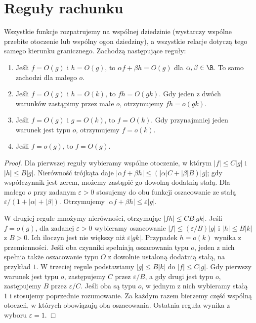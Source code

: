 \section{Reguły rachunku}
\begin{twierdzenie}
\label{ma1:thm:landau-algebra}
Wszystkie funkcje rozpatrujemy na wspólnej dziedzinie (wystarczy wspólne przebite otoczenie lub wspólny ogon dziedziny), a wszystkie relacje dotyczą tego samego kierunku granicznego. Zachodzą następujące reguły:
\begin{enumerate}
 \item Jeśli $f=O(g)$ i $h=O(g)$, to $\alpha f+\beta h=O(g)$ dla $\alpha,\beta\in\R$. To samo zachodzi dla małego $o$.
 \item Jeśli $f=O(g)$ i $h=O(k)$, to $fh=O(gk)$. Gdy jeden z dwóch warunków zastąpimy przez małe $o$, otrzymujemy $fh=o(gk)$.
 \item Jeśli $f=O(g)$ i $g=O(k)$, to $f=O(k)$. Gdy przynajmniej jeden warunek jest typu $o$, otrzymujemy $f=o(k)$.
 \item Jeśli $f=o(g)$, to $f=O(g)$.
\end{enumerate}
\end{twierdzenie}
\begin{proof}
Dla pierwszej reguły wybieramy wspólne otoczenie, w którym $|f|\le C|g|$ i $|h|\le B|g|$. Nierówność trójkąta daje
$|\alpha f+\beta h|\le(|\alpha|C+|\beta|B)|g|$; gdy współczynnik jest zerem, możemy zastąpić go dowolną dodatnią stałą. Dla małego $o$ przy zadanym $\varepsilon>0$ stosujemy do obu funkcji oszacowanie ze stałą $\varepsilon/(1+|\alpha|+|\beta|)$. Otrzymujemy $|\alpha f+\beta h|\le\varepsilon|g|$.

W drugiej regule mnożymy nierówności, otrzymując $|fh|\le CB|gk|$. Jeśli $f=o(g)$, dla zadanej $\varepsilon>0$ wybieramy oszacowanie $|f|\le(\varepsilon/B)|g|$ i $|h|\le B|k|$ z $B>0$. Ich iloczyn jest nie większy niż $\varepsilon|gk|$. Przypadek $h=o(k)$ wynika z przemienności. Jeśli oba czynniki spełniają oszacowania typu $o$, jeden z nich spełnia także oszacowanie typu $O$ z dowolnie ustaloną dodatnią stałą, na przykład $1$. W trzeciej regule podstawiamy $|g|\le B|k|$ do $|f|\le C|g|$. Gdy pierwszy warunek jest typu $o$, zastępujemy $C$ przez $\varepsilon/B$, a gdy drugi jest typu $o$, zastępujemy $B$ przez $\varepsilon/C$. Jeśli oba są typu $o$, w jednym z nich wybieramy stałą $1$ i stosujemy poprzednie rozumowanie. Za każdym razem bierzemy część wspólną otoczeń, w których obowiązują oba oszacowania. Ostatnia reguła wynika z wyboru $\varepsilon=1$.
\end{proof}

